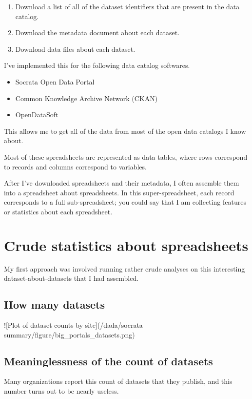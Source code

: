 \documentclass{acm_proc_article-sp}
\begin{document}
\begin{enumerate}
\item Download a list of all of the dataset identifiers that are present in the data catalog.
\item Download the metadata document about each dataset.
\item Download data files about each dataset.
\end{enumerate}

I've implemented this for the following data catalog softwares.

\begin{itemize}
\item Socrata Open Data Portal
\item Common Knowledge Archive Network (CKAN)
\item OpenDataSoft
\end{itemize}

This allows me to get all of the data from most of the open data catalogs I know about.

Most of these spreadsheets are represented as data tables,
where rows correspond to records and columns correspond to variables. \cite{table}

After I've downloaded spreadsheets and their metadata,
I often assemble them into a spreadsheet about spreadsheets. \cite{data-driven}
In this super-spreadsheet, each record corresponds to a full
sub-spreadsheet; you could say that I am collecting features or statistics
about each spreadsheet.

\section{Crude statistics about spreadsheets}
My first approach was involved running rather crude analyses on this
interesting dataset-about-datasets that I had assembled.

\subsection{How many datasets}
![Plot of dataset counts by site](/dada/socrata-summary/figure/big_portals_datasets.png)

\subsection{Meaninglessness of the count of datasets}

Many organizations report this count of datasets that they publish, and this number
turns out to be nearly useless.
\end{document}
